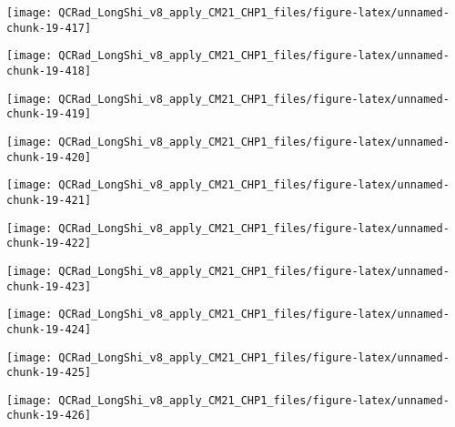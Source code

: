 \documentclass[
  10pt,
  a4paper,oneside]{article}
\begin{document}
\begin{center}\texttt{[image: QCRad\_LongShi\_v8\_apply\_CM21\_CHP1\_files/figure-latex/unnamed-chunk-19-417]} \end{center}

\begin{center}\texttt{[image: QCRad\_LongShi\_v8\_apply\_CM21\_CHP1\_files/figure-latex/unnamed-chunk-19-418]} \end{center}

\begin{center}\texttt{[image: QCRad\_LongShi\_v8\_apply\_CM21\_CHP1\_files/figure-latex/unnamed-chunk-19-419]} \end{center}

\begin{center}\texttt{[image: QCRad\_LongShi\_v8\_apply\_CM21\_CHP1\_files/figure-latex/unnamed-chunk-19-420]} \end{center}

\begin{center}\texttt{[image: QCRad\_LongShi\_v8\_apply\_CM21\_CHP1\_files/figure-latex/unnamed-chunk-19-421]} \end{center}

\begin{center}\texttt{[image: QCRad\_LongShi\_v8\_apply\_CM21\_CHP1\_files/figure-latex/unnamed-chunk-19-422]} \end{center}

\begin{center}\texttt{[image: QCRad\_LongShi\_v8\_apply\_CM21\_CHP1\_files/figure-latex/unnamed-chunk-19-423]} \end{center}

\begin{center}\texttt{[image: QCRad\_LongShi\_v8\_apply\_CM21\_CHP1\_files/figure-latex/unnamed-chunk-19-424]} \end{center}

\begin{center}\texttt{[image: QCRad\_LongShi\_v8\_apply\_CM21\_CHP1\_files/figure-latex/unnamed-chunk-19-425]} \end{center}

\begin{center}\texttt{[image: QCRad\_LongShi\_v8\_apply\_CM21\_CHP1\_files/figure-latex/unnamed-chunk-19-426]} \end{center}
\end{document}
